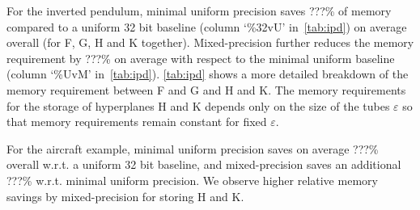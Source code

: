 

For the inverted pendulum, minimal uniform precision saves ???\% of memory
compared to a uniform 32 bit baseline (column `\%32vU' in~\autoref{tab:ipd}) on
average overall (for F, G, H and K together). Mixed-precision further reduces the memory
requirement by ???\% on average with respect to the minimal uniform baseline
(column `\%UvM' in~\autoref{tab:ipd}). 
\autoref{tab:ipd} shows a more detailed breakdown of the memory requirement
between F and G and H and K. The memory requirements for the storage of
hyperplanes H and K depends only on the size of the tubes $\varepsilon$ so that
memory requirements remain constant for fixed $\varepsilon$.

For the aircraft example, minimal uniform precision saves on average ???\%
overall w.r.t. a uniform 32 bit baseline, and mixed-precision saves an
additional ???\% w.r.t. minimal uniform precision. We observe higher relative
memory savings by mixed-precision for storing H and K.

